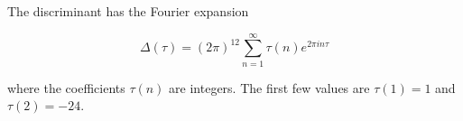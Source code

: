 The discriminant has the Fourier expansion

$$\Delta(\tau) = (2\pi)^{12} \sum_{n=1}^{\infty} \tau(n)e^{2\pi i n \tau}$$

where the coefficients $\tau(n)$ are integers. The first few values are $\tau(1) = 1$ and $\tau(2) = -24$.
